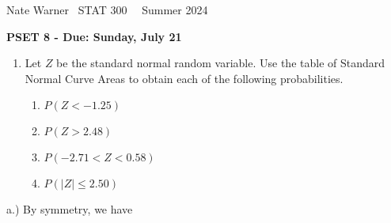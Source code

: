\documentclass{report}
\title{\Huge{}}
\author{\huge{Nathan Warner}}
\date{\huge{}}
\begin{document}
 \pagebreak \bigbreak \noindent
 Nate Warner \ \quad \quad \quad \quad \quad \quad \quad \quad \quad \quad \quad \quad  STAT 300 \quad  \quad \quad \quad \quad \quad \quad \quad \quad \ \ \quad Summer 2024
 \begin{center}
     \textbf{PSET 8 - Due: Sunday, July 21}
 \end{center}
 \bigbreak \noindent 
 \begin{mdframed}
     \begin{enumerate}[label=\arabic*.]
         \item Let \( Z \) be the standard normal random variable. Use the table of Standard Normal Curve Areas to obtain each of the following probabilities.
             \begin{enumerate}[label=(\alph*)]
                 \item \( P(Z < -1.25) \)
                 \item \( P(Z > 2.48) \)
                 \item \( P(-2.71 < Z < 0.58) \)
                 \item \( P(|Z| \leq 2.50) \)
             \end{enumerate}
     \end{enumerate}
 \end{mdframed}
 \bigbreak \noindent 
 a.) By symmetry, we have
\end{document}
